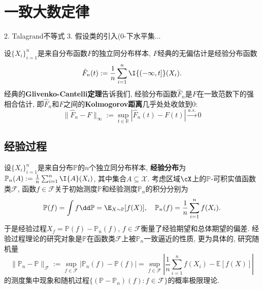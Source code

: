 \section{一致大数定律}


2. Talagrand不等式
3. 假设类的引入(0-下水平集...
 
设$\{X_i\}_{i=1}^n$是来自分布函数$F$的独立同分布样本, $F$经典的无偏估计是经验分布函数
\begin{equation*}
	\hat F_n(t) 
	:= \frac{1}{n} \sum_{i=1}^n \I{(-\infty, t]}(X_i). 
\end{equation*}
经典的\textbf{Glivenko-Cantelli定理}告诉我们, 经验分布函数$\hat F_n$是$F$在一致范数下的强相合估计, 即$\hat F_n$和$F$之间的\textbf{Kolmogorov距离}几乎处处收敛到$0$: 
\begin{equation*}
	\|\hat F_n - F\|_{\infty} 
	:= \sup_{t \in \mathbb{R}} |\hat F_n(t) - F(t)| \stackrel{a.s.}{\to} 0
\end{equation*}

%


\subsection{经验过程}

设$\{X_i\}_{i=1}^n$是来自分布$\mathbb{P}$的$n$个独立同分布样本, \textbf{经验分布}为$\mathbb{P}_n(A) := \frac{1}{n} \sum_{i=1}^n \I{A}(X_i)$, 其中集合$A \subseteq \mathcal{X}$. 
考虑区域$\cX$上的$\mathbb{P}$-可积实值函数类$\mathscr{F}$, 函数$f \in \mathscr{F}$关于初始测度$\mathbb{P}$和经验测度$\mathbb{P}_n$的积分分别为 
\begin{equation*}
	\mathbb{P}(f) = \int f \dd \mathbb{P} = \E_{X \sim \mathbb{P}} [f(X)], \quad
	\mathbb{P}_n(f) = \frac{1}{n} \sum_{i=1}^n f(X_i). 
\end{equation*}
于是经验过程$X_f = \mathbb{P}(f) - \mathbb{P}_n(f)$, $f \in \mathscr{F}$衡量了经验期望和总体期望的偏差. 
经验过程理论的研究对象是$\mathbb{P}$在函数类$\mathscr{F}$上被$\mathbb{P}_n$一致逼近的性质, 更为具体的, 研究随机量 
\begin{equation*}
	\|\mathbb{P}_n - \mathbb{P}\|_{\mathscr{F}} 
	:= \sup_{f \in\mathscr{F}} \left| \mathbb{P}_n(f) - \mathbb{P}(f) \right|
	= \sup_{f \in\mathscr{F}} \left| \frac{1}{n} \sum_{i=1}^n f(X_i) - \mathbb{E}[f(X)] \right|
\end{equation*}
的测度集中现象和随机过程$\{(\mathbb{P} - \mathbb{P}_n)(f) \colon f \in \mathscr{F}\}$的概率极限理论. 

